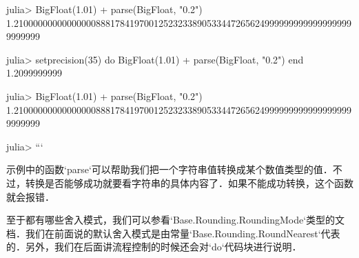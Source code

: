 julia> BigFloat(1.01) + parse(BigFloat, "0.2")
1.21000000000000000888178419700125232338905334472656249999999999999999999999999

julia> setprecision(35) do 
           BigFloat(1.01) + parse(BigFloat, "0.2") 
       end
1.2099999999

julia> BigFloat(1.01) + parse(BigFloat, "0.2") 
1.21000000000000000888178419700125232338905334472656249999999999999999999999999

julia> 
```

示例中的函数`parse`可以帮助我们把一个字符串值转换成某个数值类型的值．不过，转换是否能够成功就要看字符串的具体内容了．如果不能成功转换，这个函数就会报错．

至于都有哪些舍入模式，我们可以参看`Base.Rounding.RoundingMode`类型的文档．我们在前面说的默认舍入模式是由常量`Base.Rounding.RoundNearest`代表的．另外，我们在后面讲流程控制的时候还会对`do`代码块进行说明．